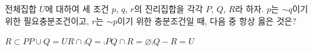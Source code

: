 전체집합 $U$에 대하여 세 조건 $p$, $q$, $r$의 진리집합을 각각 $P$, $Q$, $R$라 하자. $p$는 $\sim q$이기 위한 필요충분조건이고, $r$는 $\sim p$이기 위한 충분조건일 때, 다음 중 항상 옳은 것은?
\begin{choices32}{$R\subset P$}{$P\cup Q=U$}{$R\cap\comp{Q}=\comp{P}$}{$Q\cap R=\varnothing$}{$\comp{Q}-R=U$}\end{choices32}
